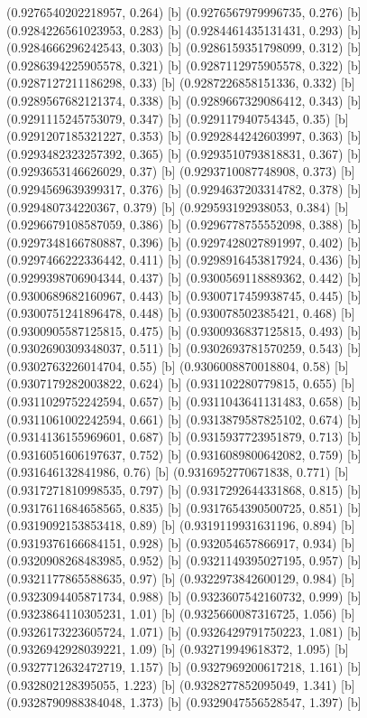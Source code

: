 {{{(0.9276540202218957, 0.264) [b] 
(0.9276567979996735, 0.276) [b] 
(0.9284226561023953, 0.283) [b] 
(0.9284461435131431, 0.293) [b] 
(0.9284666296242543, 0.303) [b] 
(0.9286159351798099, 0.312) [b] 
(0.9286394225905578, 0.321) [b] 
(0.9287112975905578, 0.322) [b] 
(0.9287127211186298, 0.33) [b] 
(0.9287226858151336, 0.332) [b] 
(0.9289567682121374, 0.338) [b] 
(0.9289667329086412, 0.343) [b] 
(0.9291115245753079, 0.347) [b] 
(0.929117940754345, 0.35) [b] 
(0.9291207185321227, 0.353) [b] 
(0.9292844242603997, 0.363) [b] 
(0.9293482323257392, 0.365) [b] 
(0.9293510793818831, 0.367) [b] 
(0.9293653146626029, 0.37) [b] 
(0.9293710087748908, 0.373) [b] 
(0.9294569639399317, 0.376) [b] 
(0.9294637203314782, 0.378) [b] 
(0.929480734220367, 0.379) [b] 
(0.929593192938053, 0.384) [b] 
(0.9296679108587059, 0.386) [b] 
(0.9296778755552098, 0.388) [b] 
(0.9297348166780887, 0.396) [b] 
(0.9297428027891997, 0.402) [b] 
(0.9297466222336442, 0.411) [b] 
(0.9298916453817924, 0.436) [b] 
(0.9299398706904344, 0.437) [b] 
(0.9300569118889362, 0.442) [b] 
(0.9300689682160967, 0.443) [b] 
(0.9300717459938745, 0.445) [b] 
(0.9300751241896478, 0.448) [b] 
(0.930078502385421, 0.468) [b] 
(0.9300905587125815, 0.475) [b] 
(0.9300936837125815, 0.493) [b] 
(0.9302690309348037, 0.511) [b] 
(0.9302693781570259, 0.543) [b] 
(0.9302763226014704, 0.55) [b] 
(0.9306008870018804, 0.58) [b] 
(0.9307179282003822, 0.624) [b] 
(0.931102280779815, 0.655) [b] 
(0.9311029752242594, 0.657) [b] 
(0.9311043641131483, 0.658) [b] 
(0.9311061002242594, 0.661) [b] 
(0.9313879587825102, 0.674) [b] 
(0.9314136155969601, 0.687) [b] 
(0.9315937723951879, 0.713) [b] 
(0.9316051606197637, 0.752) [b] 
(0.9316089800642082, 0.759) [b] 
(0.931646132841986, 0.76) [b] 
(0.9316952770671838, 0.771) [b] 
(0.9317271810998535, 0.797) [b] 
(0.9317292644331868, 0.815) [b] 
(0.9317611684658565, 0.835) [b] 
(0.9317654390500725, 0.851) [b] 
(0.9319092153853418, 0.89) [b] 
(0.9319119931631196, 0.894) [b] 
(0.9319376166684151, 0.928) [b] 
(0.932054657866917, 0.934) [b] 
(0.9320908268483985, 0.952) [b] 
(0.9321149395027195, 0.957) [b] 
(0.9321177865588635, 0.97) [b] 
(0.9322973842600129, 0.984) [b] 
(0.9323094405871734, 0.988) [b] 
(0.9323607542160732, 0.999) [b] 
(0.9323864110305231, 1.01) [b] 
(0.9325660087316725, 1.056) [b] 
(0.9326173223605724, 1.071) [b] 
(0.9326429791750223, 1.081) [b] 
(0.9326942928039221, 1.09) [b] 
(0.932719949618372, 1.095) [b] 
(0.9327712632472719, 1.157) [b] 
(0.9327969200617218, 1.161) [b] 
(0.932802128395055, 1.223) [b] 
(0.9328277852095049, 1.341) [b] 
(0.9328790988384048, 1.373) [b] 
(0.9329047556528547, 1.397) [b] 
}}}
